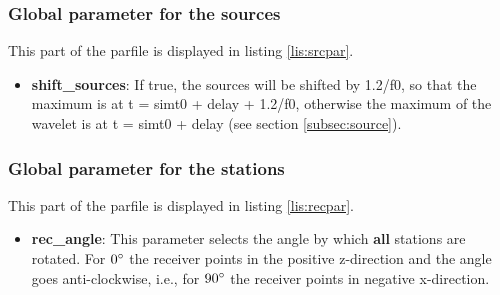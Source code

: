		\subsubsection{Global parameter for the sources}
			This part of the parfile is displayed in listing \ref{lis:srcpar}.			
			
    		\begin{itemize}
    	 		\item \textbf{shift\_sources}: If true, the sources will be shifted by 1.2/f0, so that the maximum is at t = simt0 + delay + 1.2/f0, otherwise the maximum of the wavelet is at t = simt0 + delay (see section \ref{subsec:source}).
    		\end{itemize}
    
		\subsubsection{Global parameter for the stations}
			This part of the parfile is displayed in listing \ref{lis:recpar}.			
			
    	\begin{itemize}
    	 \item \textbf{rec\_angle}: This parameter selects the angle by which \textbf{all} stations are rotated. For $0\degree$ the receiver points in the positive z-direction and the angle goes anti-clockwise, i.e., for $90\degree$ the receiver points in negative x-direction.
    	\end{itemize}
